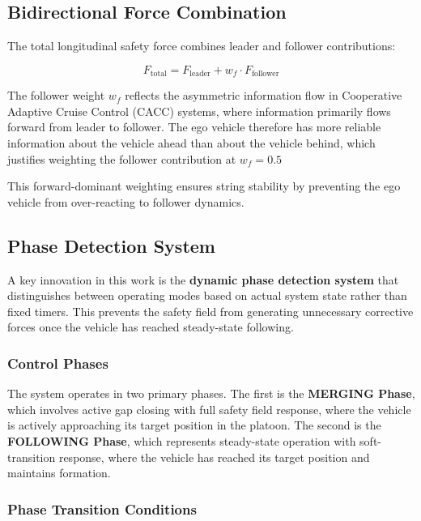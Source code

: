 \documentclass[12pt,a4paper,oneside]{report}
\begin{document}
\subsection{Bidirectional Force Combination}

The total longitudinal safety force combines leader and follower contributions:

\begin{equation}
F_{\text{total}} = F_{\text{leader}} + w_f \cdot F_{\text{follower}}
\label{eq:bidirectional_force}
\end{equation}

The follower weight $w_f$ reflects the asymmetric information flow in Cooperative Adaptive Cruise Control (CACC) systems, where information primarily flows forward from leader to follower. The ego vehicle therefore has more reliable information about the vehicle ahead than about the vehicle behind, which justifies weighting the follower contribution at $w_f = 0.5$

This forward-dominant weighting ensures string stability by preventing the ego vehicle from over-reacting to follower dynamics.

\subsection{Phase Detection System}

A key innovation in this work is the \textbf{dynamic phase detection system} that distinguishes between operating modes based on actual system state rather than fixed timers. This prevents the safety field from generating unnecessary corrective forces once the vehicle has reached steady-state following.

\subsubsection{Control Phases}

The system operates in two primary phases. The first is the \textbf{MERGING Phase}, which involves active gap closing with full safety field response, where the vehicle is actively approaching its target position in the platoon. The second is the \textbf{FOLLOWING Phase}, which represents steady-state operation with soft-transition response, where the vehicle has reached its target position and maintains formation.

\subsubsection{Phase Transition Conditions}
\end{document}
